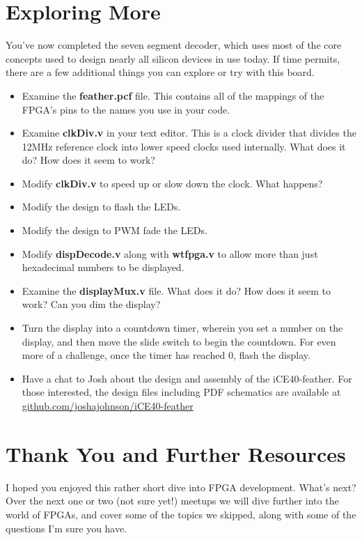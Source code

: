 \documentclass[12pt,a4paper]{article}
\begin{document}
\newpage
\section{Exploring More}
You've now completed the seven segment decoder, which uses most of the core concepts used to design nearly all silicon devices in use today. If time permits, there are a few additional things you can explore or try with this board. 
\begin{itemize}
	\item Examine the \textbf{feather.pcf} file. This contains all of the mappings of the FPGA's pins to the names you use in your code. 
	\item Examine \textbf{clkDiv.v} in your text editor. This is a clock divider that divides the 12MHz reference clock into lower speed clocks used internally. What does it do? How does it seem to work?
	\item Modify \textbf{clkDiv.v} to speed up or slow down the clock. What happens? 
	\item Modify the design to flash the LEDs.
	\item Modify the design to PWM fade the LEDs. 
	\item Modify \textbf{dispDecode.v} along with \textbf{wtfpga.v} to allow more than just hexadecimal numbers to be displayed.
	\item Examine the \textbf{displayMux.v} file. What does it do? How does it seem to work? Can you dim the display? 
	\item Turn the display into a countdown timer, wherein you set a number on the display, and then move the slide switch to begin the countdown. For even more of a challenge, once the timer has reached 0, flash the display.
	\item Have a chat to Josh about the design and assembly of the iCE40-feather. For those interested, the design files including PDF schematics are available at \newline \url{github.com/joshajohnson/iCE40-feather}
\end{itemize}

\newpage
\section{Thank You and Further Resources}
I hoped you enjoyed this rather short dive into FPGA development. What's next? Over the next one or two (not sure yet!) meetups we will dive further into the world of FPGAs, and cover some of the topics we skipped, along with some of the questions I'm sure you have. \\
\end{document}
